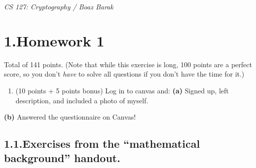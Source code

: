 \documentclass{article}
\begin{document}
\newcommand{\zo}{\{0,1\}}
\newcommand{\getsr}{\leftarrow_{\text{\tiny R}}}
\newcommand{\E}{\mathbb{E}}
\noindent{}\emph{CS 127: Cryptography / Boaz Barak}%

\section{1.\hspace*{0.5em}Homework 1}\label{sec-homework-1}%

\noindent{}Total of 141 points. (Note that while this exercise is long, 100 points are a perfect score, so you 
don't \emph{have} to solve all questions if you don't have the time for it.)%

\begin{enumerate}[noitemsep,topsep=\mdcompacttopsep,start=0]%

\item{}(10 points + 5 points bonus) Log in to canvas and:
\textbf{(a)} Signed up, left description, and included a photo of myself.%
\end{enumerate}%

\noindent{}\textbf{(b)} Answered the questionnaire on Canvas!%

\subsection{1.1.\hspace*{0.5em}Exercises from the \textquotedblleft{}mathematical background\textquotedblright{} handout.}\label{sec-exercises-from-the-mathematical-background-handout}%
\end{document}
